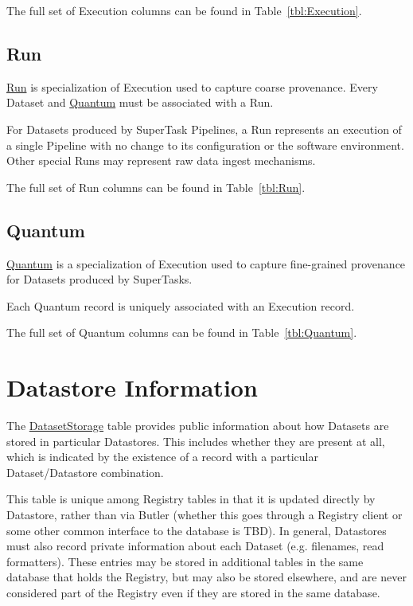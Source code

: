 \documentclass[DM,toc]{lsstdoc}
\newcommand{\tblref}[1]{\hyperref[tbl:#1]{#1}}
\newcommand{\coltable}[1]{
    \begin{table}[htb]
        {
            \footnotesize
            
        }
        \caption{#1 Columns}
        \label{tbl:#1}
    \end{table}
}
\begin{document}
The full set of Execution columns can be found in Table~\ref{tbl:Execution}.

\coltable{Execution}

\subsection{Run}
\label{sec:run}

\tblref{Run} is specialization of Execution used to capture coarse provenance.
Every Dataset and \hyperref[sec:quantum]{Quantum} must be associated with a Run.

For Datasets produced by SuperTask Pipelines, a Run represents an execution of a single Pipeline with no change to its configuration or the software environment.
Other special Runs may represent raw data ingest mechanisms.

The full set of Run columns can be found in Table~\ref{tbl:Run}.

\coltable{Run}

\subsection{Quantum}
\label{sec:quantum}

\tblref{Quantum} is a specialization of Execution used to capture fine-grained provenance for Datasets produced by SuperTasks.

Each Quantum record is uniquely associated with an Execution record.

The full set of Quantum columns can be found in Table~\ref{tbl:Quantum}.

\coltable{Quantum}

\section{Datastore Information}
\label{sec:datastore-information}

The \tblref{DatasetStorage} table provides public information about how Datasets are stored in particular Datastores.  This includes whether they are present at all, which is indicated by the existence of a record with a particular Dataset/Datastore combination.

\coltable{DatasetStorage}

This table is unique among Registry tables in that it is updated directly by Datastore, rather than via Butler (whether this goes through a Registry client or some other common interface to the database is TBD).
In general, Datastores must also record private information about each Dataset (e.g. filenames, read formatters).
These entries may be stored in additional tables in the same database that holds the Registry, but may also be stored elsewhere, and are never considered part of the Registry even if they are stored in the same database.
\end{document}
